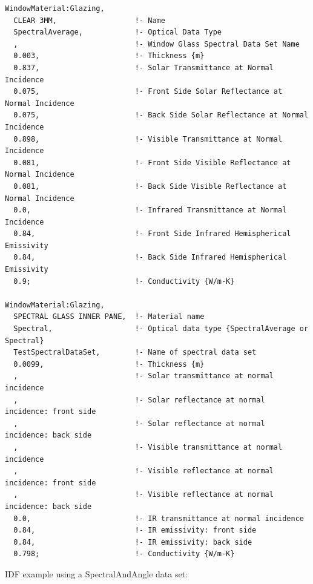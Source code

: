\begin{lstlisting}
WindowMaterial:Glazing,
  CLEAR 3MM,                  !- Name
  SpectralAverage,            !- Optical Data Type
  ,                           !- Window Glass Spectral Data Set Name
  0.003,                      !- Thickness {m}
  0.837,                      !- Solar Transmittance at Normal Incidence
  0.075,                      !- Front Side Solar Reflectance at Normal Incidence
  0.075,                      !- Back Side Solar Reflectance at Normal Incidence
  0.898,                      !- Visible Transmittance at Normal Incidence
  0.081,                      !- Front Side Visible Reflectance at Normal Incidence
  0.081,                      !- Back Side Visible Reflectance at Normal Incidence
  0.0,                        !- Infrared Transmittance at Normal Incidence
  0.84,                       !- Front Side Infrared Hemispherical Emissivity
  0.84,                       !- Back Side Infrared Hemispherical Emissivity
  0.9;                        !- Conductivity {W/m-K}

WindowMaterial:Glazing,
  SPECTRAL GLASS INNER PANE,  !- Material name
  Spectral,                   !- Optical data type {SpectralAverage or Spectral}
  TestSpectralDataSet,        !- Name of spectral data set
  0.0099,                     !- Thickness {m}
  ,                           !- Solar transmittance at normal incidence
  ,                           !- Solar reflectance at normal incidence: front side
  ,                           !- Solar reflectance at normal incidence: back side
  ,                           !- Visible transmittance at normal incidence
  ,                           !- Visible reflectance at normal incidence: front side
  ,                           !- Visible reflectance at normal incidence: back side
  0.0,                        !- IR transmittance at normal incidence
  0.84,                       !- IR emissivity: front side
  0.84,                       !- IR emissivity: back side
  0.798;                      !- Conductivity {W/m-K}
\end{lstlisting}

IDF example using a SpectralAndAngle data set:

